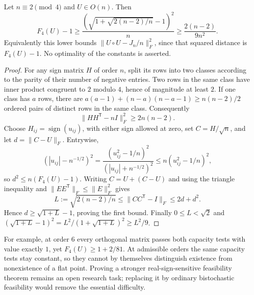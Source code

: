 \begin{proposition}
Let $n\equiv2\pmod4$ and $U\in O(n)$. Then
\[
 F_4(U)-1\ge
 \frac{\left(\sqrt{1+\sqrt{2(n-2)/n}}-1\right)^2}{n}
 \ge \frac{2(n-2)}{9n^2}.
\]
Equivalently this lower bounds
$\|U\circ U-J_n/n\|_F^2$, since that squared distance is $F_4(U)-1$.
No optimality of the constants is asserted.
\end{proposition}
\begin{proof}
For any sign matrix $H$ of order $n$, split its rows into two classes
according to the parity of their number of negative entries.
Two rows in the same class have inner product congruent to $2$
modulo $4$, hence of magnitude at least $2$. If one class has $a$
rows, there are $a(a-1)+(n-a)(n-a-1)\ge n(n-2)/2$ ordered pairs of
distinct rows in the same class. Consequently
\[
 \|HH^{\mathsf T}-nI\|_F^2\ge2n(n-2).
\]
Choose $H_{ij}=\operatorname{sign}(u_{ij})$, with either sign allowed
at zero, set $C=H/\sqrt n$, and let $d=\|C-U\|_F$.
Entrywise,
\[
 \left(|u_{ij}|-n^{-1/2}\right)^2
 =\frac{(u_{ij}^2-1/n)^2}{(|u_{ij}|+n^{-1/2})^2}
 \le n(u_{ij}^2-1/n)^2,
\]
so $d^2\le n(F_4(U)-1)$. Writing $C=U+(C-U)$ and using the
triangle inequality and $\|EE^{\mathsf T}\|_F\le\|E\|_F^2$ gives
\[
 L:=\sqrt{2(n-2)/n}\le\|CC^{\mathsf T}-I\|_F\le2d+d^2.
\]
Hence $d\ge\sqrt{1+L}-1$, proving the first bound.
Finally $0\le L<\sqrt2$ and
$(\sqrt{1+L}-1)^2=L^2/(1+\sqrt{1+L})^2\ge L^2/9$.
\end{proof}

For example, at order $6$ every orthogonal matrix passes both capacity
tests with value exactly $1$, yet $F_4(U)\ge1+2/81$.
At admissible orders the same capacity tests stay constant, so they
cannot by themselves distinguish existence from nonexistence of a flat
point. Proving a stronger real-sign-sensitive feasibility theorem remains
an open research task; replacing it by ordinary bistochastic feasibility
would remove the essential difficulty.
